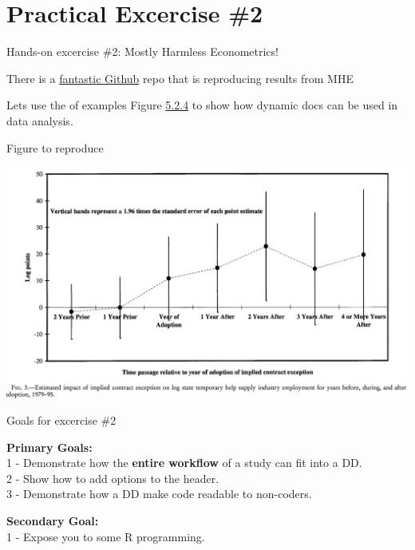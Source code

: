 \documentclass[ignorenonframetext,]{beamer}
\begin{document}
\hypertarget{practical-excercise-2}{%
\section{Practical Excercise \#2}\label{practical-excercise-2}}

\begin{frame}{Hands-on excercise \#2: Mostly Harmless Econometrics!}
\protect\hypertarget{hands-on-excercise-2-mostly-harmless-econometrics}{}

There is a
\href{https://github.com/vikjam/mostly-harmless-replication}{fantastic
Github} repo that is reproducing results from MHE

Lets use the of examples Figure
\href{https://github.com/vikjam/mostly-harmless-replication/blob/master/05\%20Fixed\%20Effects\%2C\%20DD\%20and\%20Panel\%20Data/Figure\%205-2-4.r}{5.2.4}
to show how dynamic docs can be used in data analysis.

\end{frame}

\begin{frame}{Figure to reproduce}
\protect\hypertarget{figure-to-reproduce}{}

\includegraphics{../Images/autor_fig.png}

\end{frame}

\begin{frame}{Goals for excercise \#2}
\protect\hypertarget{goals-for-excercise-2}{}

\textbf{Primary Goals:}\\
1 - Demonstrate how the \textbf{entire workflow} of a study can fit into
a DD.\\
2 - Show how to add options to the header.\\
3 - Demonstrate how a DD make code readable to non-coders.

\pause

\textbf{Secondary Goal:}\\
1 - Expose you to some R programming.

\end{frame}
\end{document}
